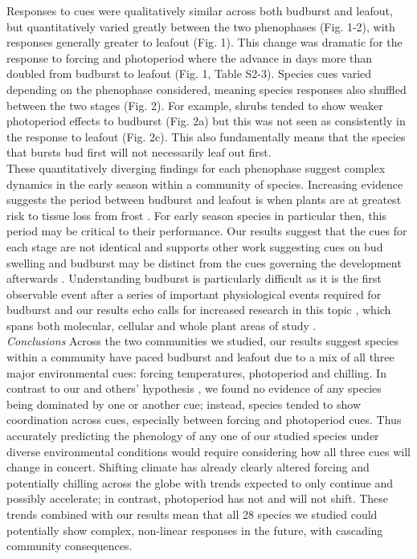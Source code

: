\documentclass[11pt]{article}
\begin{document}
Responses to cues were qualitatively similar across both budburst and leafout, but quantitatively varied greatly between the two phenophases (Fig. 1-2), with responses generally greater to leafout (Fig. 1). This change was dramatic for the response to forcing and photoperiod where the advance in days more than doubled from budburst to leafout (Fig. 1, Table S2-3). Species cues varied depending on the phenophase considered, meaning species responses also shuffled between the two stages (Fig. 2). For example, shrubs tended to show weaker photoperiod effects to budburst (Fig. 2a) but this was not seen as consistently in the response to leafout (Fig. 2c). This also fundamentally means that the species that bursts bud first will not necessarily leaf out first. \\

These quantitatively diverging findings for each phenophase suggest complex dynamics in the early season within a community of species. Increasing evidence suggests the period between budburst and leafout is when plants are at greatest risk to tissue loss from frost \cite{Lenz:2013aa}. For early season species in particular then, this period may be critical to their performance. Our results suggest that the cues for each stage are not identical and supports other work suggesting cues on bud swelling and budburst may be distinct from the cues governing the development afterwards \cite{Basler:2014aa}. Understanding budburst is particularly difficult as it is the first observable event after a series of important physiological events required for budburst \cite[endo and ecodormancy,][]{Caffarra:2011aa,vitasse2014rev} and our results echo calls for increased research in this topic \cite{chuine2016}, which spans both molecular, cellular and whole plant areas of study \cite{Morin:2009,rinne2011,singh2017}. \\

\emph{Conclusions}
Across the two communities we studied, our results suggest species within a community have paced budburst and leafout due to a mix of all three major environmental cues: forcing temperatures, photoperiod and chilling. In contrast to our and others' hypothesis \cite{Korner:2010}, we found no evidence of any species being dominated by one or another cue; instead, species tended to show coordination across cues, especially between forcing and photoperiod cues.  Thus accurately predicting the phenology of any one of our studied species under diverse environmental conditions would require considering how all three cues will change in concert. Shifting climate has already clearly altered forcing and potentially chilling across the globe \cite{ipcc2013,IPCC:2014sm} with trends expected to only continue and possibly accelerate; in contrast, photoperiod has not and will not shift. These trends combined with our results mean that all 28 species we studied could potentially show complex, non-linear responses in the future, with cascading community consequences. %
\end{document}
